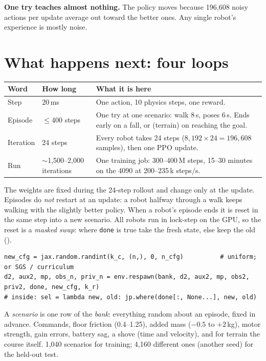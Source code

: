 \documentclass[10pt,letterpaper]{article}
\newcommand{\cc}[1]{\texttt{\detokenize{#1}}}
\begin{document}
\begin{note}
\textbf{One try teaches almost nothing.} The policy moves because 196{,}608 noisy actions per update average out toward the
better ones. Any single robot's experience is mostly noise.
\end{note}

\section{What happens next: four loops}

\begin{small}
\begin{tabularx}{\linewidth}{@{}llX@{}}
\toprule
\textbf{Word} & \textbf{How long} & \textbf{What it is here} \\ \midrule
Step & 20\,ms & One action, 10 physics steps, one reward. \\
Episode & $\le$400 steps & One try at one scenario: walk 8\,s, poses 6\,s. Ends early on a fall, or (terrain) on reaching the goal. \\
Iteration & 24 steps & Every robot takes 24 steps ($8{,}192\times24=196{,}608$ samples), then one PPO update. \\
Run & $\sim$1{,}500–2{,}000 iterations & One training job: 300–400\,M steps, 15–30 minutes on the 4090 at 200–235\,k steps/s. \\ \bottomrule
\end{tabularx}
\end{small}

The weights are fixed during the 24-step rollout and change only at the update. Episodes do \emph{not} restart at an update: a
robot halfway through a walk keeps walking with the slightly better policy. When a robot's episode ends it is reset in the same
step into a new scenario. All robots run in lock-step on the GPU, so the reset is a \emph{masked swap}: where \texttt{done} is
true take the fresh state, else keep the old (\cc{GpuEnv.respawn}).
\begin{lstlisting}
new_cfg = jax.random.randint(k_c, (n,), 0, n_cfg)          # uniform; or SGS / curriculum
d2, aux2, mp, obs_n, priv_n = env.respawn(bank, d2, aux2, mp, obs2, priv2, done, new_cfg, k_r)
# inside: sel = lambda new, old: jp.where(done[:, None...], new, old)
\end{lstlisting}

A \emph{scenario} is one row of the \emph{bank}: everything random about an episode, fixed in advance. Commands, floor friction
(0.4–1.25), added mass ($-0.5$ to $+2$\,kg), motor strength, gain errors, battery sag, a shove (time and velocity), and for
terrain the course itself. 1{,}040 scenarios for training; 4{,}160 different ones (another seed) for the held-out test.
\end{document}
